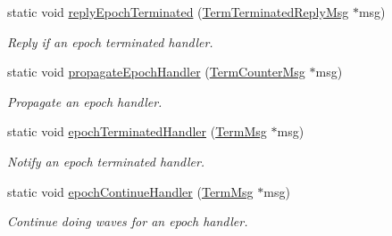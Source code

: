 \begin{DoxyCompactItemize}
static void \hyperlink{structvt_1_1term_1_1_termination_detector_ad4e25e7f6a8703bdff30bc2f56ab195f}{reply\+Epoch\+Terminated} (\hyperlink{structvt_1_1term_1_1_term_terminated_reply_msg}{Term\+Terminated\+Reply\+Msg} $\ast$msg)
\begin{DoxyCompactList}\small\item\em Reply if an epoch terminated handler. \end{DoxyCompactList}\item 
static void \hyperlink{structvt_1_1term_1_1_termination_detector_a75c8f7279bbd48daec2ddc7ee0f0b7b3}{propagate\+Epoch\+Handler} (\hyperlink{structvt_1_1term_1_1_term_counter_msg}{Term\+Counter\+Msg} $\ast$msg)
\begin{DoxyCompactList}\small\item\em Propagate an epoch handler. \end{DoxyCompactList}\item 
static void \hyperlink{structvt_1_1term_1_1_termination_detector_af1429c4e6d684bc0487f1b4a6d6bbf43}{epoch\+Terminated\+Handler} (\hyperlink{structvt_1_1term_1_1_term_msg}{Term\+Msg} $\ast$msg)
\begin{DoxyCompactList}\small\item\em Notify an epoch terminated handler. \end{DoxyCompactList}\item 
static void \hyperlink{structvt_1_1term_1_1_termination_detector_a5791344ef9d163fa9cb17b136ca68549}{epoch\+Continue\+Handler} (\hyperlink{structvt_1_1term_1_1_term_msg}{Term\+Msg} $\ast$msg)
\begin{DoxyCompactList}\small\item\em Continue doing waves for an epoch handler. \end{DoxyCompactList}\end{DoxyCompactItemize}
